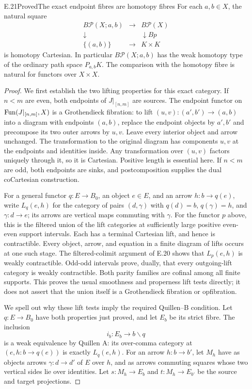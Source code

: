 \begin{claim}{E.21}{Proved}{The exact endpoint fibres are homotopy fibres}
For each $a,b\in X$, the natural square
\[
\begin{array}{ccc}
 B\mathcal P(X;a,b)&\longrightarrow&B\mathcal P(X)\\
 \downarrow&&\downarrow Bp\\
 \{(a,b)\}&\longrightarrow&K\times K
\end{array}
\]
is homotopy Cartesian. In particular $B\mathcal P(X;a,b)$ has the weak homotopy type of the ordinary path space $P_{a,b}K$. The comparison with the homotopy fibre is natural for functors over $X\times X$.
\end{claim}
\begin{proof}
We first establish the two lifting properties for this exact category. If $n<m$ are even, both endpoints of $J|_{[n,m]}$ are sources. The endpoint functor on $\operatorname{Fun}(J|_{[n,m]},X)$ is a Grothendieck fibration: to lift $(u,v):(a',b')\to(a,b)$ into a diagram with endpoints $(a,b)$, replace the endpoint objects by $a',b'$ and precompose its two outer arrows by $u,v$. Leave every interior object and arrow unchanged. The transformation to the original diagram has components $u,v$ at the endpoints and identities inside. Any transformation over $(u,v)$ factors uniquely through it, so it is Cartesian. Positive length is essential here. If $n<m$ are odd, both endpoints are sinks, and postcomposition supplies the dual coCartesian construction.

For a general functor $q:E\to B_0$, an object $e\in E$, and an arrow $h:b\to q(e)$, write $L_q(e,h)$ for the category of pairs $(d,\gamma)$ with $q(d)=b$, $q(\gamma)=h$, and $\gamma:d\to e$; its arrows are vertical maps commuting with $\gamma$. For the functor $p$ above, this is the filtered union of the lift categories at sufficiently large positive even-even support intervals. Each has a terminal Cartesian lift, and hence is contractible. Every object, arrow, and equation in a finite diagram of lifts occurs at one such stage. The filtered-colimit argument of E.20 shows that $L_p(e,h)$ is weakly contractible. Odd-odd intervals prove, dually, that every outgoing-lift category is weakly contractible. Both parity families are cofinal among all finite supports. This proves the usual smoothness and properness lift tests directly; it does not assert that the union itself is a Grothendieck fibration or opfibration.

We spell out why these lift tests imply the required Quillen--B condition. Let $q:E\to B_0$ have both properties just proved, and let $E_b$ be its strict fibre. The inclusion
\[
                 i_b:E_b\longrightarrow b\backslash q
\]
is a weak equivalence by Quillen A: its over-comma category at $(e,h:b\to q(e))$ is exactly $L_q(e,h)$. For an arrow $h:b\to b'$, let $M_h$ have as objects arrows $\gamma:d\to d'$ of $E$ over $h$, and as arrows commuting squares whose two vertical sides lie over identities. Let $s:M_h\to E_b$ and $t:M_h\to E_{b'}$ be the source and target projections.


\end{proof}
